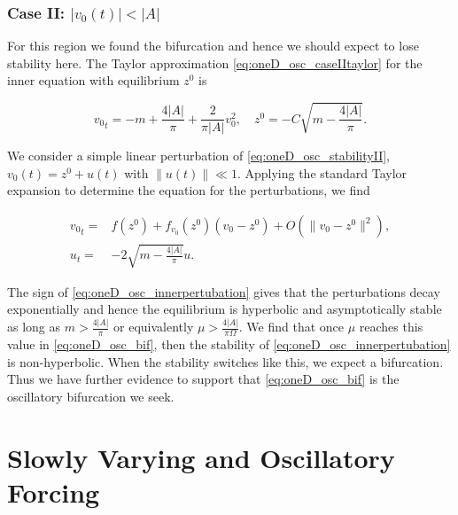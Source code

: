 \subsubsection{Case II: $|v_0(t)|<|A|$}

For this region we found the bifurcation and hence we should expect to lose stability here. The Taylor approximation \eqref{eq:oneD_osc_caseIItaylor} for the inner equation with equilibrium $z^0$ is

\begin{equation}\label{eq:oneD_osc_stabilityII}
{v_0}_t= -m +\frac{4|A|}{\pi}+\frac{2}{\pi |A|}v_0^2,\quad z^0=-C \sqrt{m-\frac{4|A|}{\pi}}.
\end{equation}

We consider a simple linear perturbation of \eqref{eq:oneD_osc_stabilityII}, $v_0(t)=z^0+u(t)$ with $\lVert u(t) \rVert \ll 1$. Applying the standard Taylor expansion to determine the equation for the perturbations, we find

\begin{equation}\label{eq:oneD_osc_innerpertubation}
\begin{aligned}
{v_0}_t =& f(z^0)+f_{v_0}(z^0)(v_0-z^0)+ O(\lVert v_0-z^0\rVert^2),\\ 
u_t =& -2\sqrt{m-\frac{4|A|}{\pi}} u .
\end{aligned}
\end{equation}

\indent The sign of \eqref{eq:oneD_osc_innerpertubation} gives that the perturbations decay exponentially and hence the equilibrium is hyperbolic and asymptotically stable as long as $m>\frac{4|A|}{\pi}$ or equivalently $\mu>\frac{4|A|}{\pi \Omega}$. We find that once $\mu$ reaches this value in \eqref{eq:oneD_osc_bif}, then the stability of \eqref{eq:oneD_osc_innerpertubation} is non-hyperbolic. When the stability switches like this, we expect a bifurcation. Thus we have further evidence to support that \eqref{eq:oneD_osc_bif} is the oscillatory bifurcation we seek.

\section{Slowly Varying and Oscillatory Forcing}
\label{sec:oneD_slowosc}


